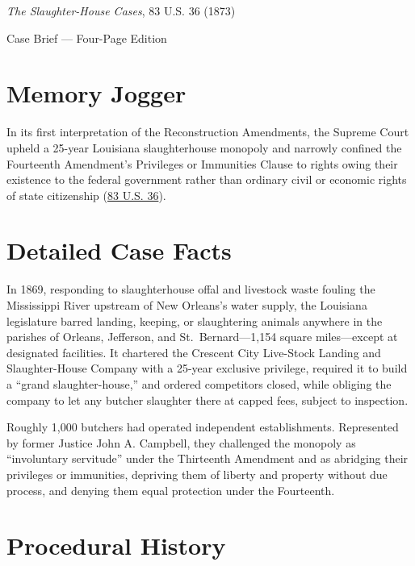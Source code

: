 \documentclass[12pt]{article}
\begin{document}
\begin{center}
{\LARGE \textit{The Slaughter-House Cases}, 83 U.S. 36 (1873)\par}
\vspace{0.8em}
{\large Case Brief --- Four-Page Edition\par}
\end{center}
\vspace{1em}

\section{Memory Jogger}

In its first interpretation of the Reconstruction Amendments, the Supreme Court upheld a 25-year Louisiana slaughterhouse monopoly and narrowly confined the Fourteenth Amendment's Privileges or Immunities Clause to rights owing their existence to the federal government rather than ordinary civil or economic rights of state citizenship (\href{https://www.courtlistener.com/opinion/88661/butchers-benevolent-assn-v-crescent-city-live-stock-landing/}{83 U.S. 36}).

\section{Detailed Case Facts}

In 1869, responding to slaughterhouse offal and livestock waste fouling the Mississippi River upstream of New Orleans's water supply, the Louisiana legislature barred landing, keeping, or slaughtering animals anywhere in the parishes of Orleans, Jefferson, and St.\ Bernard---1,154 square miles---except at designated facilities. It chartered the Crescent City Live-Stock Landing and Slaughter-House Company with a 25-year exclusive privilege, required it to build a ``grand slaughter-house,'' and ordered competitors closed, while obliging the company to let any butcher slaughter there at capped fees, subject to inspection.

Roughly 1,000 butchers had operated independent establishments. Represented by former Justice John A. Campbell, they challenged the monopoly as ``involuntary servitude'' under the Thirteenth Amendment and as abridging their privileges or immunities, depriving them of liberty and property without due process, and denying them equal protection under the Fourteenth.

\section{Procedural History}
\end{document}
